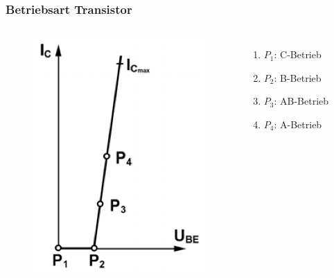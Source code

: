 \begin{frame}
  \frametitle{Betriebsart Transistor}
  \begin{columns}[c]
    \column[c]{5cm}
    \begin{center}
      \begin{figure}
        \includegraphics[width=1\textwidth,height=.7\textheight,keepaspectratio]{a07/TD419.png}
      \end{figure}
    \end{center}
    \column{5cm} \Large
    \begin{enumerate}
      \item $P_1$: C-Betrieb
      \item $P_2$: B-Betrieb
      \item $P_3$: AB-Betrieb
      \item $P_4$: A-Betrieb
    \end{enumerate}
  \end{columns}
\end{frame}

